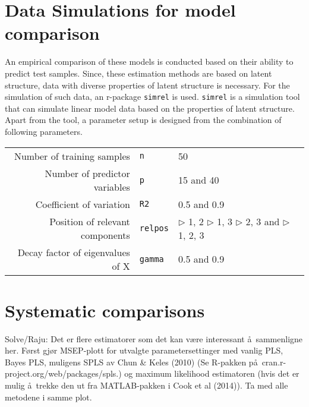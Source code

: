 \documentclass[a4paper, 11pt]{article}
\begin{document}
\section{Data Simulations for model comparison}

An empirical comparison of these models is conducted based on their ability to
predict test samples. Since, these estimation methods are based on latent
structure, data with diverse properties of latent structure is necessary. For
the simulation of such data, an r-package {\tt simrel} is used. {\tt simrel} is
a simulation tool that can simulate linear model data based on the properties of
latent structure. Apart from the tool, a parameter setup is designed from the
combination of following parameters.

\bigskip

\begin{tabular}{rll}
  Number of training samples       & {\tt n}     & 50 \\
  Number of predictor variables    & {\tt p}     & 15 and 40 \\
  Coefficient of variation         & {\tt R2}    & 0.5 and 0.9 \\
  Position of relevant components  & {\tt relpos}
                                   & $\triangleright$ 1, 2 \;           
                                    $\triangleright$ 1,  3 \; \newline  
                                    $\triangleright$ 2,  3 and \;       
                                    $\triangleright$ 1,  2, 3 \\        
  Decay factor of eigenvalues of X & {\tt gamma} & 0.5 and 0.9
\end{tabular}

\bigskip
 


\section{Systematic comparisons}

Solve/Raju: Det er flere estimatorer som det kan v\ae re interessant \aa\ sammenligne her. F\o rst gj\o r MSEP-plott for utvalgte parametersettinger med vanlig PLS, Bayes PLS, muligens SPLS av Chun \& Keles (2010)  (Se R-pakken p\aa\ cran.r-project.org/web/packages/spls.) og maximum likelihood estimatoren (hvis det er mulig \aa\ trekke den ut fra MATLAB-pakken i Cook et al (2014)). Ta med alle metodene i samme plot. 
\end{document}
